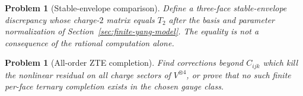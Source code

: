 \documentclass[11pt]{article}
\newtheorem{problem}[theorem]{Problem}
\theoremstyle{remark}
\begin{document}
\begin{problem}[Stable-envelope comparison]
Define a three-face stable-envelope discrepancy whose charge-\(2\)
matrix equals \(T_2\) after the basis and parameter normalization of
Section~\ref{sec:finite-yang-model}.  The equality is not a consequence
of the rational computation alone.
\end{problem}

\begin{problem}[All-order ZTE completion]
Find corrections beyond \(C_{ijk}\) which kill the nonlinear residual
on all charge sectors of \(V^{\otimes4}\), or prove that no such
finite per-face ternary completion exists in the chosen gauge class.
\end{problem}
\end{document}
